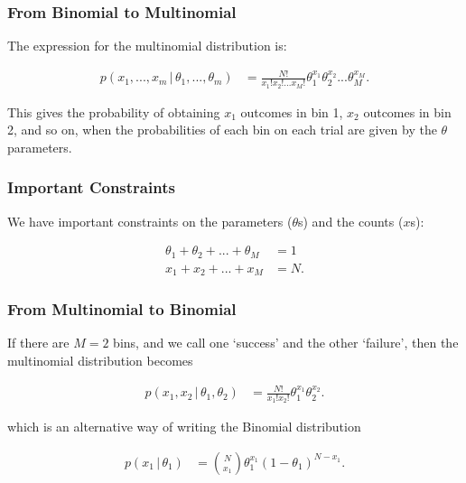 \documentclass{beamer}
\newcommand{\given}{\,|\,}
\begin{document}
\begin{frame}
\frametitle{From Binomial to Multinomial}
The expression for the multinomial distribution is:

\begin{align}
p(x_1, ..., x_m \given \theta_1, ..., \theta_m)
    &= \frac{N!}{x_1!x_2!...x_M!}\theta_1^{x_1}\theta_2^{x_2}...\theta_M^{x_M}.
\end{align}
\pause

This gives the probability of obtaining $x_1$ outcomes in bin 1,
$x_2$ outcomes in bin 2, and so on, when the probabilities
of each bin on each trial are given by the $\theta$ parameters.

\end{frame}


\begin{frame}
\frametitle{Important Constraints}
We have important constraints on the parameters ($\theta$s) and the counts
($x$s):

\begin{align}
\theta_1 + \theta_2 + ... + \theta_M &= 1 \\
x_1 + x_2 + ... + x_M &= N.
\end{align}

\end{frame}


\begin{frame}
\frametitle{From Multinomial to Binomial}
If there are $M=2$ bins, and we call one `success' and the other `failure',
then the multinomial distribution becomes

\begin{align}
p(x_1, x_2 \given \theta_1, \theta_2)
    &= \frac{N!}{x_1!x_2!}\theta_1^{x_1}\theta_2^{x_2}.
\end{align}

which is an alternative way of writing the Binomial distribution

\begin{align}
p(x_1 \given \theta_1)
    &= \binom{N}{x_1}\theta_1^{x_1}(1 - \theta_1)^{N - x_1}.
\end{align}


\end{frame}
\end{document}
